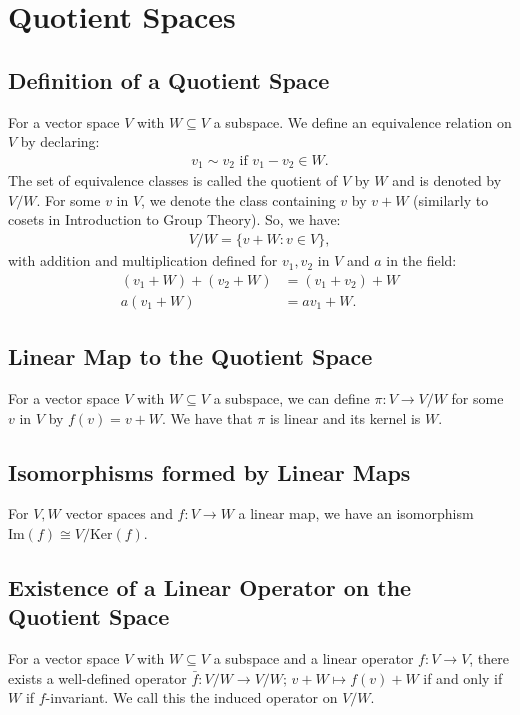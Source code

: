 \documentclass[a4paper, 12pt, twoside]{article}
\begin{document}
\section{Quotient Spaces}

\subsection{Definition of a Quotient Space}

For a vector space $V$ with $W \subseteq V$ a subspace. We define an equivalence
relation on $V$ by declaring: \begin{gather*}
  v_1 \sim v_2 \text{ if } v_1 - v_2 \in W.
\end{gather*} The set of equivalence classes is called the quotient of $V$
by $W$ and is denoted by $V/W$. For some $v$ in $V$, we denote the class containing
$v$ by $v + W$ (similarly to cosets in Introduction to Group Theory). So, we have:
\begin{gather*}
  V/W = \{v + W : v \in V\},
\end{gather*} with addition and multiplication defined for 
$v_1, v_2$ in $V$ and $a$ in the field: \begin{align*}
  (v_1 + W) + (v_2 + W) &= (v_1 + v_2) + W \\
  a(v_1 + W) &= av_1 + W.
\end{align*}

\subsection{Linear Map to the Quotient Space}

For a vector space $V$ with $W \subseteq V$ a subspace, we can
define $\pi : V \to V/W$ for some $v$ in $V$ by $f(v) = v + W$.
We have that $\pi$ is linear and its kernel is $W$.

\subsection{Isomorphisms formed by Linear Maps}

For $V, W$ vector spaces and $f : V \to W$ a linear map, we have
an isomorphism $\text{Im}(f) \cong V/\text{Ker}(f)$.

\subsection{Existence of a Linear Operator on the Quotient Space}

For a vector space $V$ with $W \subseteq V$ a subspace and a linear
operator $f : V \to V$, there exists a well-defined operator
$\bar{f} : V/W \to V/W; \, v + W \mapsto f(v) + W$ if and only if 
$W$ if $f$-invariant.
We call this the induced operator on $V/W$.
\end{document}
